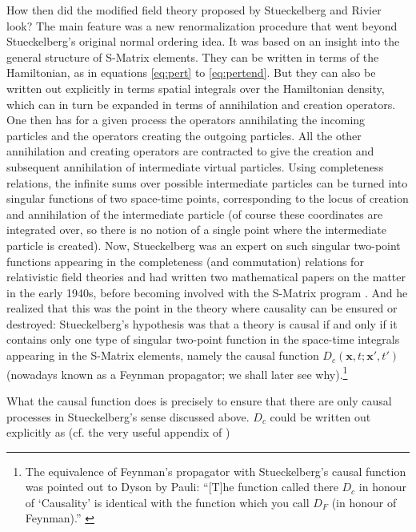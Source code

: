\documentclass[12pt]{article}
\begin{document}
How then did the modified field theory proposed by Stueckelberg and Rivier look? The main feature was a new renormalization procedure that went beyond Stueckelberg's original normal ordering idea. It was based on an insight into the general structure of S-Matrix elements. They can be written in terms of the Hamiltonian, as in equations \ref{eq:pert} to \ref{eq:pertend}. But they can also be written out explicitly in terms spatial integrals over the Hamiltonian density, which can in turn be expanded in terms of annihilation and creation operators. One then has for a given process the operators annihilating the incoming particles and the operators creating the outgoing particles. All the other annihilation and creating operators are contracted to give the creation and subsequent annihilation of intermediate virtual particles. Using completeness relations, the infinite sums over possible intermediate particles can be turned into singular functions of two space-time points, corresponding to the locus of creation and annihilation of the intermediate particle (of course these coordinates are integrated over, so there is no notion of a single point where the intermediate particle is created). Now, Stueckelberg was an expert on such singular two-point functions appearing in the completeness (and commutation) relations for relativistic field theories and had written two mathematical papers on the matter in the early 1940s, before becoming involved with the S-Matrix program \citep{stueckelberg_1942_solutions,stueckelberg_1942_solutionsb}. And he realized that this was the point in the theory where causality can be ensured or destroyed: Stueckelberg's hypothesis was that a theory is causal if and only if it contains only one type of singular two-point function in the space-time integrals appearing in the S-Matrix elements, namely the causal function $D_c (\mathbf{x}, t; \mathbf{x}', t')$ (nowadays known as a Feynman propagator; we shall later see why).\footnote{The equivalence of Feynman's propagator with Stueckelberg's causal function was pointed out to Dyson by Pauli: ``[T]he function called there $D_c$ in honour of `Causality' is identical with the function which you call $D_F$ (in honour of Feynman).'' \citep[p. 595]{meyenn_1993_wissenschaftlicher}}

What the causal function does is precisely to ensure that there are only causal processes in Stueckelberg's sense discussed above. $D_c$ could be written out explicitly as (cf. the very useful appendix of \citep{rivier_1949_une-methode})
\end{document}
